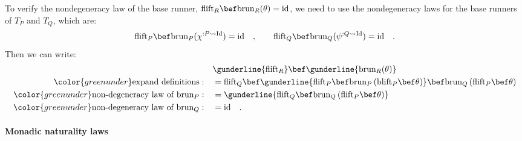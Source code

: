 To verify the nondegeneracy law of the base runner, $\text{flift}_{R}\bef\text{brun}_{R}(\theta)=\text{id}$,
we need to use the nondegeneracy laws for the base runners of $T_{P}$
and $T_{Q}$, which are: 
\[
\text{flift}_{P}\bef\text{brun}_{P}(\chi^{:P\leadsto\text{Id}})=\text{id}\quad,\quad\quad\text{flift}_{Q}\bef\text{brun}_{Q}(\psi^{:Q\leadsto\text{Id}})=\text{id}\quad.
\]
Then we can write:
\begin{align*}
 & \gunderline{\text{flift}_{R}}\bef\gunderline{\text{brun}_{R}(\theta)}\\
{\color{greenunder}\text{expand definitions}:}\quad & =\text{flift}_{Q}\bef\gunderline{\text{flift}_{P}\bef\text{brun}_{P}\left(\text{blift}_{P}\bef\theta\right)}\bef\text{brun}_{Q}\left(\text{flift}_{P}\bef\theta\right)\\
{\color{greenunder}\text{non-degeneracy law of }\text{brun}_{P}:}\quad & =\gunderline{\text{flift}_{Q}\bef\text{brun}_{Q}\left(\text{flift}_{P}\bef\theta\right)}\\
{\color{greenunder}\text{non-degeneracy law of }\text{brun}_{Q}:}\quad & =\text{id}\quad.
\end{align*}


\paragraph{Monadic naturality laws}

